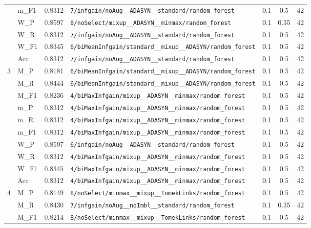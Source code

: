 \begin{table}[htbp]
\begin{tabular}{|c|l|c|>{\ttfamily\footnotesize}p{7.2cm}|c|c|c|}
 & m\_F1 & 0.8312 & \texttt{7/infgain/noAug\_\_ADASYN\_\_standard/random\_forest} & 0.1 & 0.5  & 42 \\ 
 & W\_P & 0.8597 & \texttt{8/noSelect/mixup\_\_ADASYN\_\_minmax/random\_forest} & 0.1 & 0.35  & 42 \\ 
 & W\_R & 0.8312 & \texttt{7/infgain/noAug\_\_ADASYN\_\_standard/random\_forest} & 0.1 & 0.5  & 42 \\ 
 & W\_F1 & 0.8345 & \texttt{6/biMeanInfgain/standard\_\_mixup\_\_ADASYN/random\_forest} & 0.1 & 0.5  & 42 \\ 
 & Acc & 0.8312 & \texttt{7/infgain/noAug\_\_ADASYN\_\_standard/random\_forest} & 0.1 & 0.5  & 42 \\ 
\hline
\multirow{10}{*}{3} & M\_P & 0.8181 & \texttt{6/biMeanInfgain/standard\_\_mixup\_\_ADASYN/random\_forest} & 0.1 & 0.5  & 42 \\ 
 & M\_R & 0.8444 & \texttt{6/biMeanInfgain/standard\_\_mixup\_\_ADASYN/random\_forest} & 0.1 & 0.5  & 42 \\ 
 & M\_F1 & 0.8236 & \texttt{4/biMaxInfgain/mixup\_\_ADASYN\_\_minmax/random\_forest} & 0.1 & 0.5  & 42 \\ 
 & m\_P & 0.8312 & \texttt{4/biMaxInfgain/mixup\_\_ADASYN\_\_minmax/random\_forest} & 0.1 & 0.5  & 42 \\ 
 & m\_R & 0.8312 & \texttt{4/biMaxInfgain/mixup\_\_ADASYN\_\_minmax/random\_forest} & 0.1 & 0.5  & 42 \\ 
 & m\_F1 & 0.8312 & \texttt{4/biMaxInfgain/mixup\_\_ADASYN\_\_minmax/random\_forest} & 0.1 & 0.5  & 42 \\ 
 & W\_P & 0.8597 & \texttt{6/infgain/noAug\_\_ADASYN\_\_standard/random\_forest} & 0.1 & 0.5  & 42 \\ 
 & W\_R & 0.8312 & \texttt{4/biMaxInfgain/mixup\_\_ADASYN\_\_minmax/random\_forest} & 0.1 & 0.5  & 42 \\ 
 & W\_F1 & 0.8345 & \texttt{4/biMaxInfgain/mixup\_\_ADASYN\_\_minmax/random\_forest} & 0.1 & 0.5  & 42 \\ 
 & Acc & 0.8312 & \texttt{4/biMaxInfgain/mixup\_\_ADASYN\_\_minmax/random\_forest} & 0.1 & 0.5  & 42 \\ 
\hline
\multirow{10}{*}{4} & M\_P & 0.8149 & \texttt{8/noSelect/minmax\_\_mixup\_\_TomekLinks/random\_forest} & 0.1 & 0.5  & 42 \\ 
 & M\_R & 0.8430 & \texttt{7/infgain/noAug\_\_noImbl\_\_standard/random\_forest} & 0.1 & 0.35  & 42 \\ 
 & M\_F1 & 0.8214 & \texttt{8/noSelect/minmax\_\_mixup\_\_TomekLinks/random\_forest} & 0.1 & 0.5  & 42 \\ 

\end{tabular}
\end{table}
